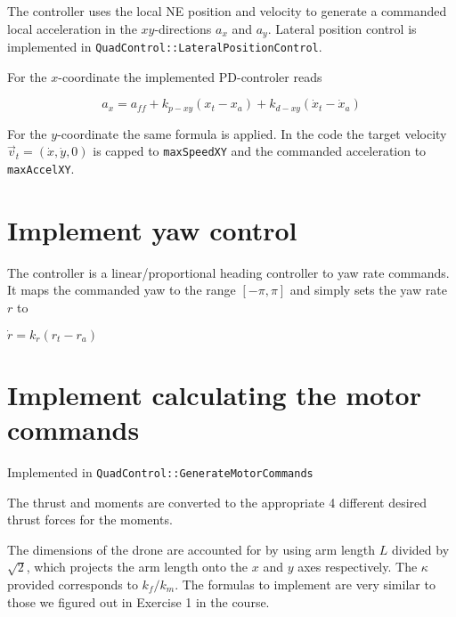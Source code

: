 \documentclass[12pt]{article}
\begin{document}
The controller uses the local NE position and velocity to generate a commanded local acceleration in the $xy$-directions $a_x$ and $a_y$. Lateral position control is implemented in \verb+QuadControl::LateralPositionControl+.

For the $x$-coordinate the implemented PD-controler reads

$$a_x = a_{ff} + k_{p-xy} (x_t - x_a) + k_{d-xy} (\dot x_t - \dot x_a)$$

For the $y$-coordinate the same formula is applied. In the code the target velocity $\vec v_t = (\dot x,\dot y,0)$ is capped to \verb+maxSpeedXY+ and the commanded acceleration to \verb+maxAccelXY+.

\section{Implement yaw control}

The controller is a linear/proportional heading controller to yaw rate commands.
It maps the commanded yaw to the range $[-\pi,\pi]$ and simply sets the yaw rate $r$ to

$\dot r = k_{r} (r_t - r_a)$

\section{Implement calculating the motor commands}

Implemented in \verb+QuadControl::GenerateMotorCommands+

The thrust and moments are converted to the appropriate 4 different desired thrust forces for the moments.

The dimensions of the drone are  accounted for by using arm length $L$ divided by $\sqrt{2}$, which projects the arm length onto the $x$ and $y$ axes respectively. The $\kappa$ provided corresponds to $k_f/k_m$. The formulas to implement are very similar to those we figured out in Exercise 1 in the course.
\end{document}
